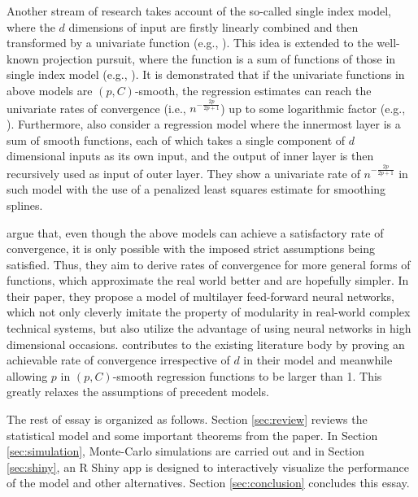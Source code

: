 Another stream of research takes account of the so-called single index model, where the $d$ dimensions of input are firstly linearly combined and then transformed by a univariate function (e.g., \cite{Hardle1993}). This idea is extended to the well-known projection pursuit, where the function is a sum of functions of those in single index model (e.g., \cite{Friedman1981}). It is demonstrated that if the univariate functions in above models are $(p,C)$-smooth, the regression estimates can reach the univariate rates of convergence (i.e., $n^{-\frac{2p}{2p+1}}$) up to some logarithmic factor (e.g., \cite{Gyoerfi2002}). Furthermore, \cite{Horowitz2007} also consider a regression model where the innermost layer is a sum of smooth functions, each of which takes a single component of $d$ dimensional inputs as its own input, and the output of inner layer is then recursively used as input of outer layer. They show a univariate rate of $n^{-\frac{2p}{2p+1}}$ in such model with the use of a penalized least squares estimate for smoothing splines.

\cite{Bauer2019} argue that, even though the above models can achieve a satisfactory rate of convergence, it is only possible with the imposed strict assumptions being satisfied. Thus, they aim to derive rates of convergence for more general forms of functions, which approximate the real world better and are hopefully simpler. In their paper, they propose a model of multilayer feed-forward neural networks, which not only cleverly imitate the property of modularity in real-world complex technical systems, but also utilize the advantage of using neural networks in high dimensional occasions. \cite{Bauer2019} contributes to the existing literature body by proving an achievable rate of convergence irrespective of $d$ in their model and meanwhile allowing $p$ in $(p,C)$-smooth regression functions to be larger than 1. This greatly relaxes the assumptions of precedent models.

The rest of essay is organized as follows. Section \ref{sec:review} reviews the statistical model and some important theorems from the paper. In Section \ref{sec:simulation}, Monte-Carlo simulations are carried out and in Section \ref{sec:shiny}, an R Shiny app is designed to interactively visualize the performance of the model and other alternatives. Section \ref{sec:conclusion} concludes this essay.